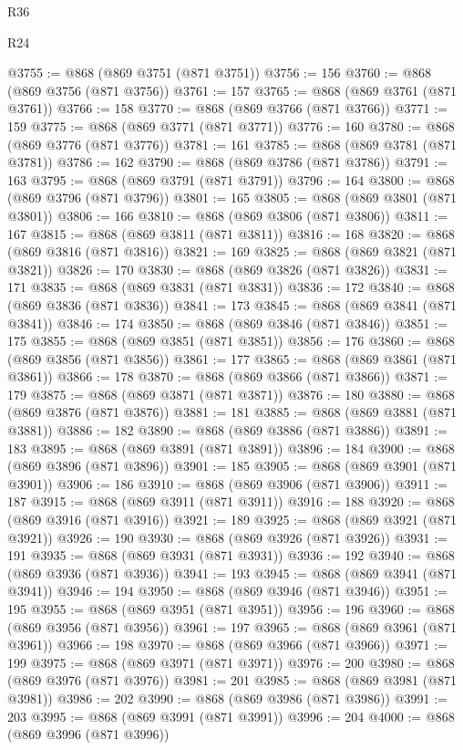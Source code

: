 \begin{lexlean}{R36}
\begin{lexlean}{R24}
\begin{coremodule}
{{{{{{{{{{{{{{{{{{{{{{{{{{{{{{{{{{{{{{{{{{{{{{{{{{{{{{{{{{{{{{{{{{{{{{{{{{{{{{{{{{{{{{{{{{{{{{{{{{{{{{{{{{{{{{{{{{{{{{{{{{{{{{{{{{{{{{{{{{{{{{{{{{{{{{{{{{{{{{{{{{{{{{{{{{{{{{{{{{{{{{{{{{{{{{{{{{{@3755 := @868 (@869 @3751 (@871 @3751))
@3756 := 156
@3760 := @868 (@869 @3756 (@871 @3756))
@3761 := 157
@3765 := @868 (@869 @3761 (@871 @3761))
@3766 := 158
@3770 := @868 (@869 @3766 (@871 @3766))
@3771 := 159
@3775 := @868 (@869 @3771 (@871 @3771))
@3776 := 160
@3780 := @868 (@869 @3776 (@871 @3776))
@3781 := 161
@3785 := @868 (@869 @3781 (@871 @3781))
@3786 := 162
@3790 := @868 (@869 @3786 (@871 @3786))
@3791 := 163
@3795 := @868 (@869 @3791 (@871 @3791))
@3796 := 164
@3800 := @868 (@869 @3796 (@871 @3796))
@3801 := 165
@3805 := @868 (@869 @3801 (@871 @3801))
@3806 := 166
@3810 := @868 (@869 @3806 (@871 @3806))
@3811 := 167
@3815 := @868 (@869 @3811 (@871 @3811))
@3816 := 168
@3820 := @868 (@869 @3816 (@871 @3816))
@3821 := 169
@3825 := @868 (@869 @3821 (@871 @3821))
@3826 := 170
@3830 := @868 (@869 @3826 (@871 @3826))
@3831 := 171
@3835 := @868 (@869 @3831 (@871 @3831))
@3836 := 172
@3840 := @868 (@869 @3836 (@871 @3836))
@3841 := 173
@3845 := @868 (@869 @3841 (@871 @3841))
@3846 := 174
@3850 := @868 (@869 @3846 (@871 @3846))
@3851 := 175
@3855 := @868 (@869 @3851 (@871 @3851))
@3856 := 176
@3860 := @868 (@869 @3856 (@871 @3856))
@3861 := 177
@3865 := @868 (@869 @3861 (@871 @3861))
@3866 := 178
@3870 := @868 (@869 @3866 (@871 @3866))
@3871 := 179
@3875 := @868 (@869 @3871 (@871 @3871))
@3876 := 180
@3880 := @868 (@869 @3876 (@871 @3876))
@3881 := 181
@3885 := @868 (@869 @3881 (@871 @3881))
@3886 := 182
@3890 := @868 (@869 @3886 (@871 @3886))
@3891 := 183
@3895 := @868 (@869 @3891 (@871 @3891))
@3896 := 184
@3900 := @868 (@869 @3896 (@871 @3896))
@3901 := 185
@3905 := @868 (@869 @3901 (@871 @3901))
@3906 := 186
@3910 := @868 (@869 @3906 (@871 @3906))
@3911 := 187
@3915 := @868 (@869 @3911 (@871 @3911))
@3916 := 188
@3920 := @868 (@869 @3916 (@871 @3916))
@3921 := 189
@3925 := @868 (@869 @3921 (@871 @3921))
@3926 := 190
@3930 := @868 (@869 @3926 (@871 @3926))
@3931 := 191
@3935 := @868 (@869 @3931 (@871 @3931))
@3936 := 192
@3940 := @868 (@869 @3936 (@871 @3936))
@3941 := 193
@3945 := @868 (@869 @3941 (@871 @3941))
@3946 := 194
@3950 := @868 (@869 @3946 (@871 @3946))
@3951 := 195
@3955 := @868 (@869 @3951 (@871 @3951))
@3956 := 196
@3960 := @868 (@869 @3956 (@871 @3956))
@3961 := 197
@3965 := @868 (@869 @3961 (@871 @3961))
@3966 := 198
@3970 := @868 (@869 @3966 (@871 @3966))
@3971 := 199
@3975 := @868 (@869 @3971 (@871 @3971))
@3976 := 200
@3980 := @868 (@869 @3976 (@871 @3976))
@3981 := 201
@3985 := @868 (@869 @3981 (@871 @3981))
@3986 := 202
@3990 := @868 (@869 @3986 (@871 @3986))
@3991 := 203
@3995 := @868 (@869 @3991 (@871 @3991))
@3996 := 204
@4000 := @868 (@869 @3996 (@871 @3996))
}}}}}}}}}}}}}}}}}}}}}}}}}}}}}}}}}}}}}}}}}}}}}}}}}}}}}}}}}}}}}}}}}}}}}}}}}}}}}}}}}}}}}}}}}}}}}}}}}}}}}}}}}}}}}}}}}}}}}}}}}}}}}}}}}}}}}}}}}}}}}}}}}}}}}}}}}}}}}}}}}}}}}}}}}}}}}}}}}}}}}}}}}}}}}}}}}}}
\end{coremodule}
\end{lexlean}
\end{lexlean}
